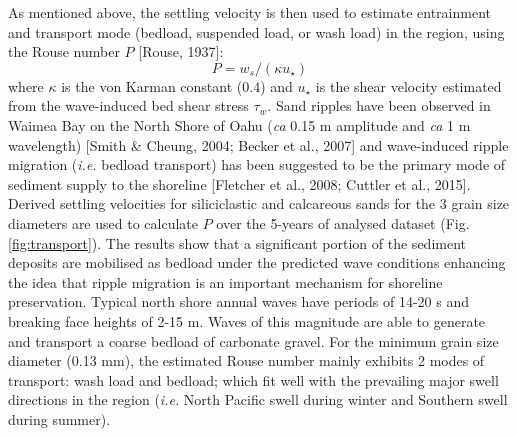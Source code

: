 \documentclass[9pt,twocolumn,twoside]{pnas-new}
\begin{document}
As mentioned above, the settling velocity is then used to estimate entrainment and transport mode (bedload, suspended load, or wash load) in the region, using the Rouse number $P$ [Rouse, 1937]: 
\begin{equation}\label{rouse}
P = w_s / (\kappa u_\star)
\end{equation}
where $\kappa$ is the von Karman constant ($0.4$) and $u_\star$ is the shear velocity estimated from the wave-induced bed shear stress $\tau_w$. Sand ripples have been observed in Waimea Bay on the North Shore of Oahu (\textit{ca} 0.15 m amplitude and \textit{ca} 1 m wavelength) [Smith \& Cheung, 2004; Becker et al., 2007] and wave-induced ripple migration (\textit{i.e.} bedload transport) has been suggested to be the primary mode of sediment supply to the shoreline [Fletcher et al., 2008; Cuttler et al., 2015]. \\
Derived settling velocities for siliciclastic and calcareous sands for the 3 grain size diameters are used to calculate $P$ over the 5-years of analysed dataset (Fig. \ref{fig:transport}). The results show that a significant portion of the sediment deposits are mobilised as bedload under the predicted wave conditions enhancing the idea that ripple migration is an important mechanism for shoreline preservation. Typical north shore annual waves have periods of 14-20 s and breaking face heights of 2-15 m. Waves of this magnitude are able to generate and transport a coarse bedload of carbonate gravel. For the minimum grain size diameter (0.13 mm), the estimated Rouse number mainly exhibits 2 modes of transport: wash load and bedload; which fit well with the prevailing major swell directions in the region (\textit{i.e.} North Pacific swell during winter and Southern swell during summer).

\end{document}
